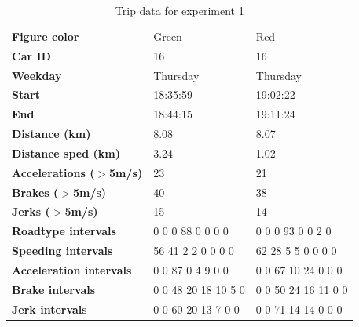\begin{table}
    \centering
    \begin{tabular}{>{\bfseries}l|ll|}
    Figure color             & Green               & Red                 \\
    Car ID                   & 16                  & 16                  \\
    Weekday                  & Thursday            & Thursday            \\
    Start                    & 18:35:59            & 19:02:22            \\
    End                      & 18:44:15            & 19:11:24            \\
    Distance (km)            & 8.08                & 8.07                \\
    Distance sped (km)       & 3.24                & 1.02                \\
    Accelerations ($>$5m/s)  & 23                  & 21                  \\
    Brakes ($>$5m/s)         & 40                  & 38                  \\
    Jerks ($>$5m/s)          & 15                  & 14                  \\
    Roadtype intervals       & 0 0 0 88 0 0 0 0    & 0 0 0 93 0 0 2 0    \\
    Speeding intervals       & 56 41 2 2 0 0 0 0   & 62 28 5 5 0 0 0 0   \\
    Acceleration intervals   & 0 0 87 0 4 9 0 0    & 0 0 67 10 24 0 0 0  \\
    Brake intervals          & 0 0 48 20 18 10 5 0 & 0 0 50 24 16 11 0 0 \\
    Jerk intervals           & 0 0 60 20 13 7 0 0  & 0 0 71 14 14 0 0 0  \\
    \end{tabular}
    \caption{Trip data for experiment 1}
    \label{tab:shorttrips}
\end{table}

